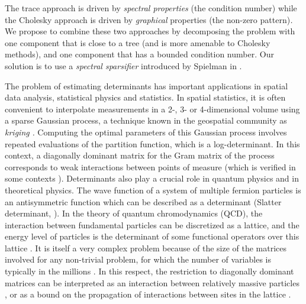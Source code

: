 The trace approach is driven by \emph{spectral properties }(the condition
number) while the Cholesky approach is driven by \emph{graphical }properties\emph{
}(the non-zero pattern)\emph{. }We\emph{ }propose to combine these
two approaches by decomposing the problem with one component that
is close to a tree (and is more amenable to Cholesky methods), and
one component that has a bounded condition number. Our solution is
to use a \emph{spectral sparsifier} introduced by Spielman in \cite{Spielman2008}.

The problem of estimating determinants has important applications
in spatial data analysis, statistical physics and statistics. In spatial
statistics, it is often convenient to interpolate measurements in
a 2-, 3- or 4-dimensional volume using a sparse Gaussian process,
a technique known in the geospatial community as \emph{kriging }\cite{zhang2010kriging,li2005analysis}\emph{.
}Computing the optimal parameters of this Gaussian process involves
repeated evaluations of the partition function, which is a log-determinant.
In this context, a diagonally dominant matrix for the Gram matrix
of the process corresponds to weak interactions between points of
measure (which is verified in some contexts \cite{KelleyPace1997291}).
Determinants also play a crucial role in quantum physics and in theoretical
physics. The wave function of a system of multiple fermion particles
is an antisymmetric function which can be described as a determinant
(Slatter determinant, \cite{atkins2011molecular,lowdin1955quantum}).
In the theory of quantum chromodynamics (QCD), the interaction between
fundamental particles can be discretized as a lattice, and the energy
level of particles is the determinant of some functional operators
over this lattice \cite{duncan1998efficient}. It is itself a very
complex problem because of the size of the matrices involved for any
non-trivial problem, for which the number of variables is typically
in the millions \cite{bernardson1994monte}. In this respect, the
restriction to diagonally dominant matrices can be interpreted as
an interaction between relatively massive particles \cite{deForcrand1989516},
or as a bound on the propagation of interactions between sites in
the lattice \cite{bernardson1994monte}.

